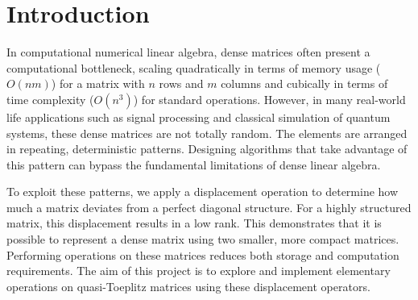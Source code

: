\section{Introduction}

In computational numerical linear algebra,
dense matrices often present a computational bottleneck,
scaling quadratically in terms of memory usage ($O(nm)$) for a matrix
with $n$ rows and $m$ columns
and cubically in terms of time complexity ($O(n^3)$) for standard operations.
However, in many real-world life applications such as signal
processing\cite{7400965}\cite{signals5030021}
and classical simulation of quantum
systems\cite{10.1098/rsos.160906}, these dense matrices are not totally random.
The elements are arranged in repeating, deterministic patterns.
Designing algorithms that take advantage of this pattern can bypass
the fundamental
limitations of dense linear algebra.

To exploit these patterns, we apply a displacement operation to
determine how much a matrix deviates from a perfect diagonal structure.
For a highly structured matrix, this displacement results in a low rank.
This demonstrates that it is possible to represent a dense matrix
using two smaller, more compact matrices.
Performing operations on these matrices reduces both storage and
computation requirements.
The aim of this project is to explore and implement elementary
operations on quasi-Toeplitz matrices using these displacement operators.
